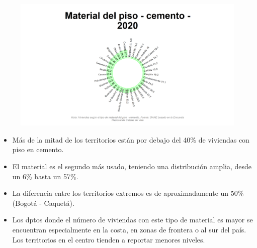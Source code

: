     \begin{figure}[H]
        \caption[Viviendas con piso de cemento por departamentos para 2020 ]{\label{piso_cemento_dptos} }
        \begin{center}
        \includegraphics[width=\textwidth,keepaspectratio]{img/var_177_static.png}    
        \end{center}
    \end{figure}
            \begin{itemize}
                    \item Más de la mitad de los territorios están por debajo del 40\% de viviendas con piso en cemento.
                    \item El material es el segundo más usado, teniendo una distribución amplia, desde un 6\% hasta un 57\%.
                    \item La diferencia entre los territorios extremos es de aproximadamente un 50\% (Bogotá - Caquetá).
                    \item Los dptos donde el número de viviendas con este tipo de material es mayor se encuentran especialmente en la costa, en zonas de frontera o al sur del país. Los territorios en el centro tienden a reportar menores niveles.
                    \end{itemize}

